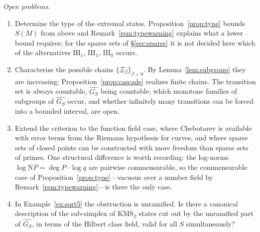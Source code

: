 \documentclass[11pt]{amsart}
\numberwithin{equation}{section}
\theoremstyle{definition}
\theoremstyle{remark}
\newcommand{\Ns}{\mathrm{N}}
\begin{document}
\emph{Open problems.}
\begin{enumerate}
\item Determine the type of the extremal states. Proposition~\ref{prop:type} bounds $S(M)$
from above and Remark~\ref{rem:typewarning} explains what a lower bound requires; for the
sparse sets of \S\ref{sec:sparse} it is not decided here which of the alternatives
$\mathrm{III}_1$, $\mathrm{III}_\lambda$, $\mathrm{III}_0$ occurs.
\item Characterize the possible chains $\{\Xi_\beta\}_{\beta>0}$. By
Lemma~\ref{lem:subgroup} they are increasing; Proposition~\ref{prop:cascade} realizes
finite chains. The transition set is always countable, $\widehat{G_S}$ being countable;
which monotone families of subgroups of $\widehat{G_S}$ occur, and whether infinitely many
transitions can be forced into a bounded interval, are open.
\item Extend the criterion to the function field case, where Chebotarev is
available with error terms from the Riemann hypothesis for curves, and where
sparse sets of closed points can be constructed with more freedom than sparse
sets of primes. One structural difference is worth recording: the log-norms
$\log\Ns P=\deg P\cdot\log q$ are pairwise commensurable, so the commensurable case of
Proposition~\ref{prop:type}---vacuous over a number field by
Remark~\ref{rem:typewarning}---is there the only case.
\item In Example~\ref{ex:sqrt5} the obstruction is unramified. Is there a
canonical description of the sub-simplex of $\mathrm{KMS}_\beta$ states cut out
by the unramified part of $\widehat{G_S}$, in terms of the Hilbert class field,
valid for all $S$ simultaneously?
\end{enumerate}
\end{document}
